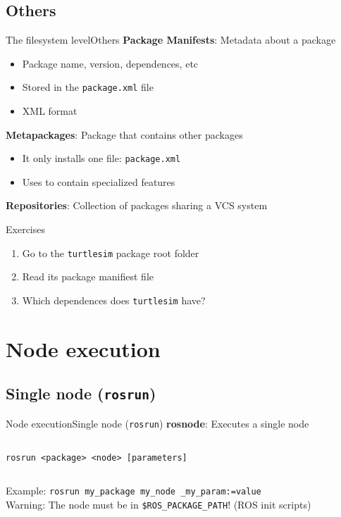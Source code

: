 \documentclass[10pt,compress]{beamer} %
\begin{document}
\subsection{Others}
\begin{frame}{The filesystem level}{Others}
	\textbf{Package Manifests}: Metadata about a package
  	\begin{itemize}
		\item Package name, version, dependences, etc
		\item Stored in the \texttt{package.xml} file
		\item XML format
	\end{itemize}
	\textbf{Metapackages}: Package that contains other packages
  	\begin{itemize}
		\item It only installs one file: \texttt{package.xml}
		\item Uses to contain specialized features
	\end{itemize}
	\textbf{Repositories}: Collection of packages sharing a VCS system
	\begin{block}{Exercises}
	\begin{enumerate}
		\item Go to the \texttt{turtlesim} package root folder
		\item Read its package manifiest file
		\item Which dependences does \texttt{turtlesim} have?
	\end{enumerate}
	\end{block}
\end{frame}


\section{Node execution}
\subsection{Single node (\texttt{rosrun})}
\begin{frame}{Node execution}{Single node (\texttt{rosrun})}
	\textbf{rosnode}: Executes a single node
    \begin{columns}
	   \begin{block}{}
	   \texttt{rosrun <package> <node> [parameters]}
	   \end{block}
	\end{columns}
	\bigskip
	Example: \texttt{rosrun my\_package my\_node \_my\_param:=value}\\
	\bigskip
	Warning: The node must be in \texttt{\$ROS\_PACKAGE\_PATH}! (ROS init scripts)
\end{frame}
\end{document}
